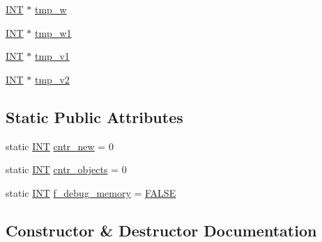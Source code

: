 \begin{DoxyCompactItemize}
\item 
\mbox{\hyperlink{galois_8h_a09fddde158a3a20bd2dcadb609de11dc}{I\+NT}} $\ast$ \mbox{\hyperlink{classaction__on__factor__space_abd99b3ab206f17c4f0f71bd5f03d249c}{tmp\+\_\+w}}
\item 
\mbox{\hyperlink{galois_8h_a09fddde158a3a20bd2dcadb609de11dc}{I\+NT}} $\ast$ \mbox{\hyperlink{classaction__on__factor__space_a166179f9ef7f3e7cba7e2a4f7cd62341}{tmp\+\_\+w1}}
\item 
\mbox{\hyperlink{galois_8h_a09fddde158a3a20bd2dcadb609de11dc}{I\+NT}} $\ast$ \mbox{\hyperlink{classaction__on__factor__space_aeb810fd253aafe34ab403d801003e190}{tmp\+\_\+v1}}
\item 
\mbox{\hyperlink{galois_8h_a09fddde158a3a20bd2dcadb609de11dc}{I\+NT}} $\ast$ \mbox{\hyperlink{classaction__on__factor__space_ade351982239e1a96ed941e3087c39418}{tmp\+\_\+v2}}
\end{DoxyCompactItemize}
\subsection*{Static Public Attributes}
\begin{DoxyCompactItemize}
\item 
static \mbox{\hyperlink{galois_8h_a09fddde158a3a20bd2dcadb609de11dc}{I\+NT}} \mbox{\hyperlink{classaction__on__factor__space_a08a22154c2a0ed3a9606d7a3cee00dc8}{cntr\+\_\+new}} = 0
\item 
static \mbox{\hyperlink{galois_8h_a09fddde158a3a20bd2dcadb609de11dc}{I\+NT}} \mbox{\hyperlink{classaction__on__factor__space_a6126483e6c88b786d9b62ffd85e09fe1}{cntr\+\_\+objects}} = 0
\item 
static \mbox{\hyperlink{galois_8h_a09fddde158a3a20bd2dcadb609de11dc}{I\+NT}} \mbox{\hyperlink{classaction__on__factor__space_a4184b5cb14b2c999e67c2813ce63f06e}{f\+\_\+debug\+\_\+memory}} = \mbox{\hyperlink{nauty_8h_aa93f0eb578d23995850d61f7d61c55c1}{F\+A\+L\+SE}}
\end{DoxyCompactItemize}


\subsection{Constructor \& Destructor Documentation}
\mbox{\label{classaction__on__factor__space_a06a81cc35c35d6c0a6696cdf56c20950}} 
